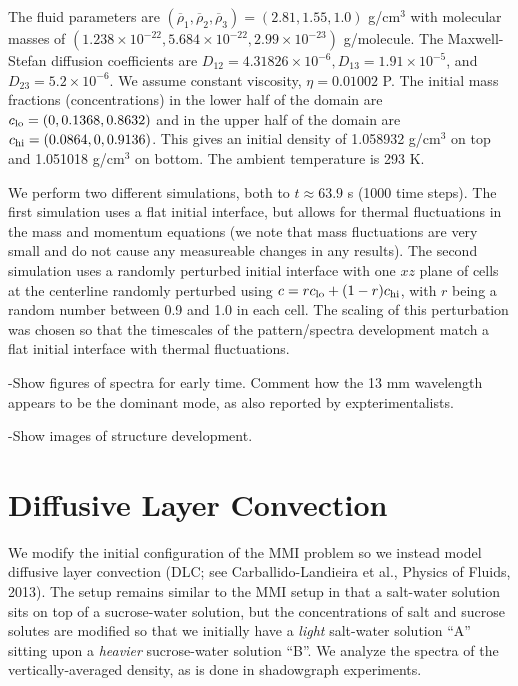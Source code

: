 \documentclass[final]{siamltex}
\begin{document}
The fluid parameters are $(\overline\rho_1, \overline\rho_2, \overline\rho_3) = (2.81, 1.55, 1.0)$ g/cm$^3$
with molecular masses of $(1.238\times 10^{-22}, 5.684\times 10^{-22}, 2.99\times 10^{-23})$ g/molecule.
The Maxwell-Stefan diffusion coefficients are
$D_{12} = 4.31826\times 10^{-6}, D_{13} = 1.91\times 10^{-5}$, and $D_{23} = 5.2\times 10^{-6}$.
We assume constant viscosity, $\eta = 0.01002$ P.  The initial mass fractions (concentrations) in the 
lower half of the domain are $c_{\rm lo} = (0, 0.1368, 0.8632)$ and in the upper half of the domain
are $c_{\rm hi} = (0.0864, 0, 0.9136)$.  This gives an initial density of 1.058932 g/cm$^3$ on top 
and 1.051018 g/cm$^3$ on bottom.  The ambient temperature is 293 K.

We perform two different simulations, both to $t\approx 63.9$ s (1000 time steps).
The first simulation uses a flat initial interface, but allows for thermal fluctuations in the mass
and momentum equations (we note that mass fluctuations are very small and do not cause any measureable
changes in any results).  The second simulation uses a randomly perturbed initial interface with one $xz$ plane 
of cells at the centerline randomly perturbed using $c = r c_{\rm lo} + (1-r) c_{\rm hi}$, with $r$ being a 
random number between 0.9 and 1.0 in each cell.  The scaling of this perturbation was chosen
so that the timescales of the pattern/spectra development match a flat initial interface with thermal fluctuations.

-Show figures of spectra for early time.  Comment how the 13 mm wavelength appears to be the dominant mode,
 as also reported by expterimentalists.

-Show images of structure development.


\section{Diffusive Layer Convection}
We modify the initial configuration of the MMI problem so we instead model
diffusive layer convection (DLC; see  Carballido-Landieira et al., Physics of Fluids, 2013).  
The setup remains similar to the MMI setup in that a salt-water solution sits on top
of a sucrose-water solution, but the concentrations of salt and sucrose solutes are modified 
so that we initially have a {\it light} salt-water solution ``A'' sitting upon a {\it heavier} 
sucrose-water solution ``B''.  We analyze the spectra of the vertically-averaged density, as 
is done in shadowgraph experiments.
\end{document}
